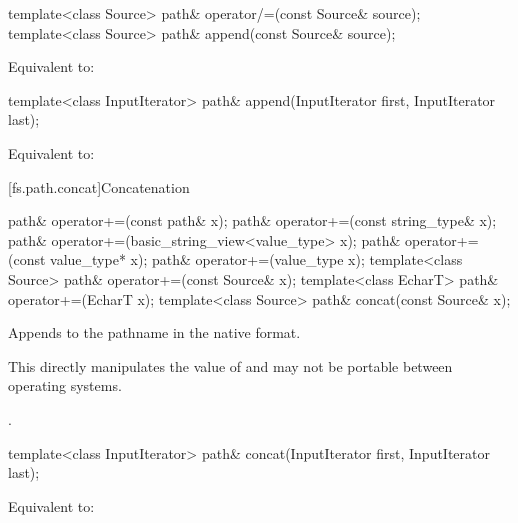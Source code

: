 %
%
\begin{itemdecl}
template<class Source>
  path& operator/=(const Source& source);
template<class Source>
  path& append(const Source& source);
\end{itemdecl}

\begin{itemdescr}
\pnum
\effects Equivalent to: 
\end{itemdescr}

%
%
\begin{itemdecl}
template<class InputIterator>
  path& append(InputIterator first, InputIterator last);
\end{itemdecl}

\begin{itemdescr}
\pnum
\effects Equivalent to: 
\end{itemdescr}

[fs.path.concat]{Concatenation}

%
%
\begin{itemdecl}
path& operator+=(const path& x);
path& operator+=(const string_type& x);
path& operator+=(basic_string_view<value_type> x);
path& operator+=(const value_type* x);
path& operator+=(value_type x);
template<class Source>
  path& operator+=(const Source& x);
template<class EcharT>
  path& operator+=(EcharT x);
template<class Source>
  path& concat(const Source& x);
\end{itemdecl}

\begin{itemdescr}
\pnum
\effects Appends  to the pathname in the native format.
\begin{note}
This directly manipulates the value of 
and may not be portable between operating systems.
\end{note}

\pnum
\returns {}.
\end{itemdescr}

%
\begin{itemdecl}
template<class InputIterator>
  path& concat(InputIterator first, InputIterator last);
\end{itemdecl}

\begin{itemdescr}
\pnum
\effects Equivalent to: 
\end{itemdescr}

